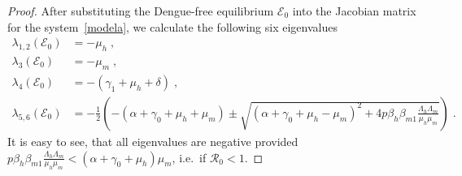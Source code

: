 \documentclass[preprint]{elsarticle}
\begin{document}
\begin{proof}
After substituting the Dengue-free equilibrium $\mathcal{E}_0$ into the Jacobian matrix for the system~\eqref{modela}, we calculate the following six eigenvalues
\begin{align*}
    \lambda_{1,2}(\mathcal{E}_0) &= -\mu_h\;,\\
    \lambda_3(\mathcal{E}_0) &= -\mu_m\;,\\
    \lambda_4(\mathcal{E}_0) &= -(\gamma_1+\mu_h+\delta)\;, \\
    \lambda_{5,6}(\mathcal{E}_0) &= -\frac{1}{2} \left( -(\alpha+\gamma_0+\mu_h+\mu_m) \pm \sqrt{(\alpha+\gamma_0+\mu_h-\mu_m)^2+4p\beta_h \beta_{m1}\frac{\Lambda_h\Lambda_m}{\mu_h\mu_m}} \right)\;.
\end{align*}
It is easy to see, that all eigenvalues are negative provided $p\beta_h \beta_{m1}\frac{\Lambda_h\Lambda_m}{\mu_h\mu_m} < (\alpha+\gamma_0+\mu_h)\mu_m$, i.e.~if $\mathcal{R}_0<1$.

%
%
%


\end{proof}
\end{document}
